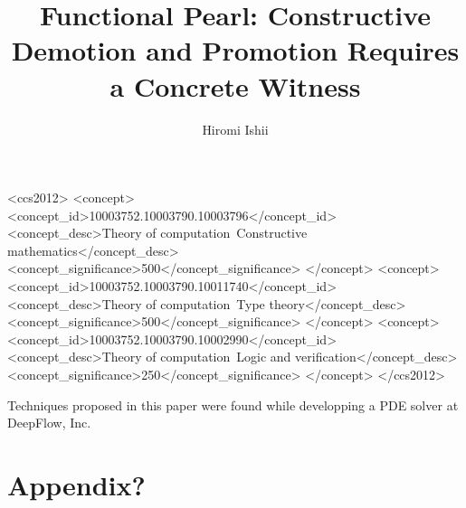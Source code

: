 \documentclass[acmsmall]{acmart}
\begin{document}
\title[Constructive Demotion]{Functional Pearl: Constructive Demotion and Promotion Requires a Concrete Witness}
\author{Hiromi Ishii}

\renewcommand{\shortauthors}{Hiromi Ishii}

\begin{abstract}
  
\end{abstract}

\begin{CCSXML}
<ccs2012>
   <concept>
       <concept_id>10003752.10003790.10003796</concept_id>
       <concept_desc>Theory of computation~Constructive mathematics</concept_desc>
       <concept_significance>500</concept_significance>
       </concept>
   <concept>
       <concept_id>10003752.10003790.10011740</concept_id>
       <concept_desc>Theory of computation~Type theory</concept_desc>
       <concept_significance>500</concept_significance>
       </concept>
   <concept>
       <concept_id>10003752.10003790.10002990</concept_id>
       <concept_desc>Theory of computation~Logic and verification</concept_desc>
       <concept_significance>250</concept_significance>
       </concept>
 </ccs2012>
\end{CCSXML}




\maketitle




\begin{acks}
Techniques proposed in this paper were found while developping a PDE solver at DeepFlow, Inc.
\end{acks}




\appendix

\section{Appendix?}
\end{document}
